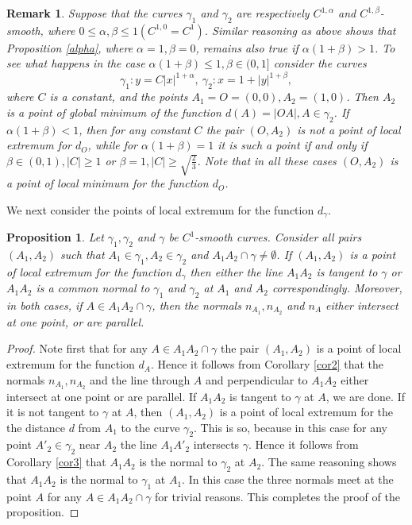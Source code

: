 \documentclass[a4paper,12pt]{amsart}
\newtheorem{prop}[thm]{Proposition}
\newtheorem{rem}[thm]{Remark}
\def\g{\gamma}
\begin{document}
\begin{rem}\label{rem1} Suppose that the curves $\g_1$ and $\g_2$ are
respectively $C^{1,\alpha}$ and $C^{1,\beta}$-smooth, where $0\leq
\alpha, \beta \leq1 (C^{1,0}=C^1)$. Similar reasoning as above
shows that Proposition \ref{alpha}, where $\alpha=1, \beta=0$,
remains also true if $\alpha(1+\beta)>1$. To see what happens in
the case $\alpha(1+\beta)\leq 1, \beta \in (0,1] $ consider the
curves
$$\g_1:y=C|x|^{1+\alpha},\ \g_2:x=1+|y|^{1+\beta} , $$
where $C$ is a constant, and the points $A_1=O=(0,0) , A_2=(1,0)$.
Then $A_2$ is a point of global minimum of the function $d(A)=
|OA|, A\in \g_2$. If $\alpha(1+\beta)< 1$, then for any constant
$C$ the pair $(O,A_2)$ is not a point of local extremum  for $d_O$,
while for $\alpha(1+\beta)=1$ it is such a point if and only if
$\beta \in (0,1) , |C|\geq 1$ or $\beta=1,
|C|\ge\sqrt{\frac{2}{3}}$. Note that in all these cases $(O,A_2)$
is a point of local minimum for the function $d_O$.
\end{rem}
\smallskip

We next consider the points of local extremum for the function $d_{\g}$.

\begin{prop} \label{norm3} Let $\g_1 , \g_2$ and $\g$ be
$C^1$-smooth curves. Consider all pairs
$(A_1,A_2)$ such that $A_1\in \g_1 , A_2\in \g_2$
and $A_1A_2 \cap \g \neq \emptyset$. If
$(A_1,A_2)$ is a point of local
extremum for the function $d_{\g}$ then either the line $A_1A_2$ is
tangent to $\g$ or $A_1A_2$ is a common
normal to $\g_1$ and $\g_2$ at $A_1$ and $A_2$
correspondingly. Moreover, in both cases, if $A\in A_1A_2 \cap \g$, then the
normals $n_{A_1} , n_{A_2}$ and $n_A$ either intersect at one
point, or are parallel.
\end{prop}

\begin{proof} Note first that for any $A\in A_1A_2 \cap \g$ the
pair $(A_1,A_2)$ is a point of local extremum for the function
$d_A$. Hence it follows from Corollary \ref{cor2} that the normals
$n_{A_1}, n_{A_2}$ and the line through $A$ and perpendicular to
$A_1A_2$ either intersect at one point or are parallel. If
$A_1A_2$ is tangent to $\g$ at $A$, we are done. If it is not
tangent to $\g$ at $A$, then $(A_1,A_2)$ is a point of local extremum
for the the distance $d$ from $A_1$ to the
curve $\g_2$. This is so, because in this case for any point
$A'_2\in \g_2$ near $A_2$ the line $A_1A'_2$ intersects $\g$.
Hence it follows from Corollary \ref{cor3} that $A_1A_2$ is the
normal to $\g_2$ at $A_2$. The same reasoning shows that $A_1A_2$
is the normal to $\g_1$ at $A_1$. In this case the three normals meet at the point $A$ for any $A\in A_1A_2 \cap \g$ for trivial reasons. This completes the proof of the proposition.
\end{proof}
\end{document}
